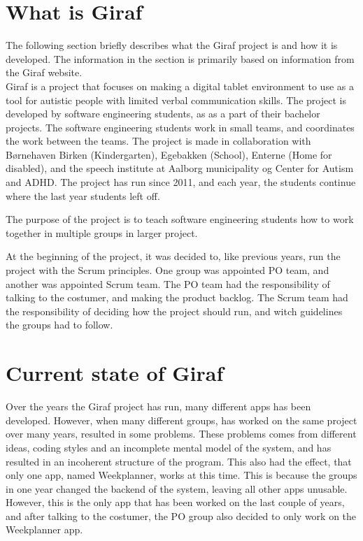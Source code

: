 \section{What is Giraf} %
\label{cha:What is Giraf}

The following section briefly describes what the Giraf project is and how it is developed. The information in the section is primarily based on information from the Giraf website\cite{GirafWebsite}.
\\
Giraf is a project that focuses on making a digital tablet environment to use as a tool for autistic people with limited verbal communication skills. The project is developed by software engineering students, as as a part of their bachelor projects.  The software engineering students work in small teams, and coordinates the work between the teams. The project is made in collaboration with Børnehaven Birken (Kindergarten)\cite{bhBirken}, Egebakken (School)\cite{egebakken}, Enterne (Home for disabled)\cite{enterne}, and the speech institute at Aalborg municipality og Center for Autism and ADHD\cite{center_for_autism}. The project has run since 2011, and each year, the students continue where the last year students left off. 

The purpose of the project is to teach software engineering students how to work together in multiple groups in larger project. 

At the beginning of the project, it was decided to, like previous years, run the project with the Scrum principles. One group was appointed \gls{PO} team, and another was appointed Scrum team. The \gls{PO} team had the responsibility of talking to the costumer, and making the product backlog. The Scrum team had the responsibility of deciding how the project should run, and witch guidelines the groups had to follow. 

\section{Current state of Giraf}

Over the years the Giraf project has run, many different apps has been developed. However, when many different groups, has worked on the same project over many years,  resulted in some problems. 
These problems comes from different ideas, coding styles and an incomplete mental model of the system, and has resulted in an incoherent structure of the program. 
This also had the effect, that only one app, named Weekplanner, works at this time. This is because the groups in one year changed the backend of the system, leaving all other apps unusable. 
However, this is the only app that has been worked on the last couple of years, and after talking to the costumer, the \gls{PO} group also decided to only work on the Weekplanner app.   

